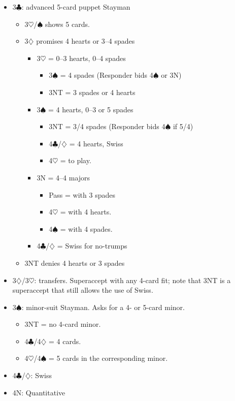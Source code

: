 \documentclass[a4paper,14pt]{extarticle}
\begin{document}
\begin{itemize}
\label{note:8}
\item 3$\clubsuit$: advanced 5-card puppet Stayman
	\begin{itemize}
   \item 3$\heartsuit$/$\spadesuit$ shows 5 cards.
   \item 3$\diamondsuit$ promises 4 hearts or 3--4 spades
		\begin{itemize}
      \item 3$\heartsuit$ = 0--3 hearts, 0--4 spades
			\begin{itemize}
         \item 3$\spadesuit$ = 4 spades (Responder bids 4$\spadesuit$ or 3N)
         \item 3NT = 3 spades or 4 hearts
			\end{itemize}
      \item 3$\spadesuit$ = 4 hearts, 0--3 or 5 spades
			\begin{itemize}
         \item 3NT = 3/4 spades (Responder bids 4$\spadesuit$ if 5/4)
         \item 4$\clubsuit$/$\diamondsuit$ = 4 hearts, Swiss 
         \item 4$\heartsuit$ = to play.
			\end{itemize}
      \item 3N = 4--4 majors
			\begin{itemize}
			\item Pass = with 3 spades
         \item 4$\heartsuit$ = with 4 hearts.
         \item 4$\spadesuit$ = with 4 spades.
			\end{itemize}
		\item 4$\clubsuit$/$\diamondsuit$ = Swiss  for no-trumps
		\end{itemize}
   \item 3NT denies 4 hearts or 3 spades
	\end{itemize}

\item 3$\diamondsuit$/3$\heartsuit$: transfers.  Superaccept with any 4-card fit; note that 3NT is a
superaccept that still allows the use of Swiss.

\label{note:10}
\item 3$\spadesuit$: minor-suit Stayman.  Asks for a 4- or 5-card minor.
	\begin{itemize}
   \item 3NT = no 4-card minor.
   \item 4$\clubsuit$/4$\diamondsuit$ = 4 cards.
   \item 4$\heartsuit$/4$\spadesuit$ = 5 cards in the corresponding minor.
	\end{itemize}

\item 4$\clubsuit$/$\diamondsuit$: Swiss 
\item 4N: Quantitative
\end{itemize}
\end{document}
